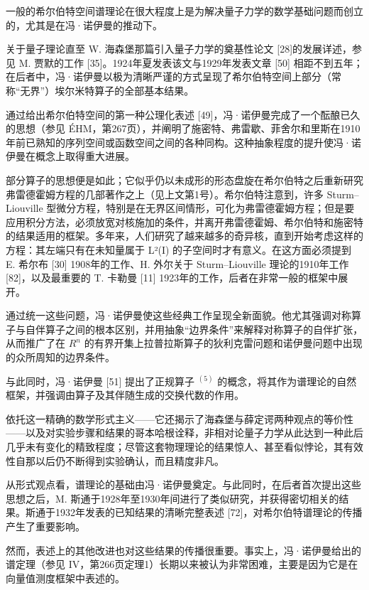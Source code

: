 
一般的希尔伯特空间谱理论在很大程度上是为解决量子力学的数学基础问题而创立的，尤其是在冯·诺伊曼的推动下。

关于量子理论直至 W. 海森堡那篇引入量子力学的奠基性论文 {[}28{]}的发展详述，参见 M. 贾默的工作 {[}35{]}。1924年夏发表该文与1929年发表文章 {[}50{]} 相距不到五年；在后者中，冯·诺伊曼以极为清晰严谨的方式呈现了希尔伯特空间上部分（常称“无界”）埃尔米特算子的全部基本结果。

通过给出希尔伯特空间的第一种公理化表述 {[}49{]}，冯·诺伊曼完成了一个酝酿已久的思想（参见 ÉHM，第267页），并阐明了施密特、弗雷歇、菲舍尔和里斯在1910年前已熟知的序列空间或函数空间之间的各种同构。这种抽象程度的提升使冯·诺伊曼在概念上取得重大进展。

部分算子的思想便是如此；它似乎仍以未成形的形态盘旋在希尔伯特之后重新研究弗雷德霍姆方程的几部著作之上（见上文第1号）。希尔伯特注意到，许多 Sturm--Liouville 型微分方程，特别是在无界区间情形，可化为弗雷德霍姆方程；但是要应用积分方法，必须放宽对核施加的条件，并离开弗雷德霍姆、希尔伯特和施密特的结果适用的框架。多年来，人们研究了越来越多的奇异核，直到开始考虑这样的方程：其左端只有在未知量属于 L²(I) 的子空间时才有意义。在这方面必须提到 E. 希尔布 {[}30{]} 1908年的工作、H. 外尔关于 Sturm--Liouville 理论的1910年工作 {[}82{]}，以及最重要的 T. 卡勒曼 {[}11{]} 1923年的工作，后者在非常一般的框架中展开。

通过统一这些问题，冯·诺伊曼使这些经典工作呈现全新面貌。他尤其强调对称算子与自伴算子之间的根本区别，并用抽象“边界条件”来解释对称算子的自伴扩张，从而推广了在 \(R^{n}\) 的有界开集上拉普拉斯算子的狄利克雷问题和诺伊曼问题中出现的众所周知的边界条件。

与此同时，冯·诺伊曼 {[}51{]} 提出了正规算子 \(^{(5)}\) 的概念，将其作为谱理论的自然框架，并强调由算子及其伴随生成的交换代数的作用。

依托这一精确的数学形式主义——它还揭示了海森堡与薛定谔两种观点的等价性——以及对实验步骤和结果的哥本哈根诠释，非相对论量子力学从此达到一种此后几乎未有变化的精致程度；尽管这套物理理论的结果惊人、甚至看似悖论，其有效性自那以后仍不断得到实验确认，而且精度非凡。

从形式观点看，谱理论的基础由冯·诺伊曼奠定。与此同时，在后者首次提出这些思想之后，M. 斯通于1928年至1930年间进行了类似研究，并获得密切相关的结果。斯通于1932年发表的已知结果的清晰完整表述 {[}72{]}，对希尔伯特谱理论的传播产生了重要影响。

然而，表述上的其他改进也对这些结果的传播很重要。事实上，冯·诺伊曼给出的谱定理（参见 IV，第266页定理1）长期以来被认为非常困难，主要是因为它是在向量值测度框架中表述的。

